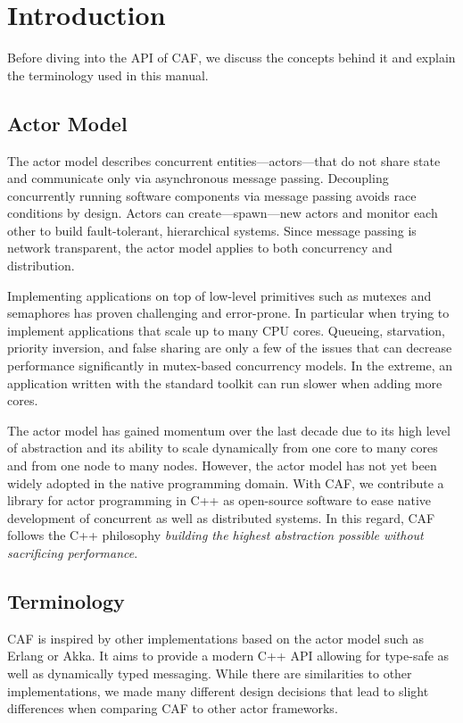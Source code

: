 \section{Introduction}

Before diving into the API of CAF, we discuss the concepts behind it and
explain the terminology used in this manual.

\subsection{Actor Model}

The actor model describes concurrent entities---actors---that do not share
state and communicate only via asynchronous message passing. Decoupling
concurrently running software components via message passing avoids race
conditions by design. Actors can create---spawn---new actors and monitor each
other to build fault-tolerant, hierarchical systems. Since message passing is
network transparent, the actor model applies to both concurrency and
distribution.

Implementing applications on top of low-level primitives such as mutexes and
semaphores has proven challenging and error-prone. In particular when trying to
implement applications that scale up to many CPU cores. Queueing, starvation,
priority inversion, and false sharing are only a few of the issues that can
decrease performance significantly in mutex-based concurrency models. In the
extreme, an application written with the standard toolkit can run slower when
adding more cores.

The actor model has gained momentum over the last decade due to its high level
of abstraction and its ability to scale dynamically from one core to many cores
and from one node to many nodes. However, the actor model has not yet been
widely adopted in the native programming domain. With CAF, we contribute a
library for actor programming in C++ as open-source software to ease native
development of concurrent as well as distributed systems. In this regard, CAF
follows the C++ philosophy \textit{building the highest abstraction possible
without sacrificing performance}.

\subsection{Terminology}

CAF is inspired by other implementations based on the actor model such as
Erlang or Akka. It aims to provide a modern C++ API allowing for type-safe as
well as dynamically typed messaging. While there are similarities to other
implementations, we made many different design decisions that lead to slight
differences when comparing CAF to other actor frameworks.

